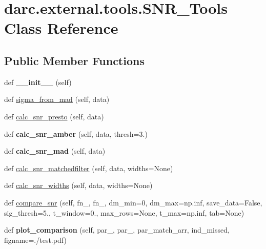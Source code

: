 \hypertarget{classdarc_1_1external_1_1tools_1_1_s_n_r___tools}{}\section{darc.\+external.\+tools.\+S\+N\+R\+\_\+\+Tools Class Reference}
\label{classdarc_1_1external_1_1tools_1_1_s_n_r___tools}
\subsection*{Public Member Functions}
\begin{DoxyCompactItemize}
\item 
\mbox{\label{classdarc_1_1external_1_1tools_1_1_s_n_r___tools_ad70f2490dd7786e16dc51864a407b737}} 
def {\bfseries \+\_\+\+\_\+init\+\_\+\+\_\+} (self)
\item 
def \mbox{\hyperlink{classdarc_1_1external_1_1tools_1_1_s_n_r___tools_a0d702d754a0292c33de8f7ef097a8cff}{sigma\+\_\+from\+\_\+mad}} (self, data)
\item 
def \mbox{\hyperlink{classdarc_1_1external_1_1tools_1_1_s_n_r___tools_a43bc80cfc5246e566f10e35753b34c1e}{calc\+\_\+snr\+\_\+presto}} (self, data)
\item 
\mbox{\label{classdarc_1_1external_1_1tools_1_1_s_n_r___tools_aec625935372545d1a31ff5c4e51b1123}} 
def {\bfseries calc\+\_\+snr\+\_\+amber} (self, data, thresh=3.)
\item 
\mbox{\label{classdarc_1_1external_1_1tools_1_1_s_n_r___tools_a050c6f507006ed54e89fd55a8ada4468}} 
def {\bfseries calc\+\_\+snr\+\_\+mad} (self, data)
\item 
def \mbox{\hyperlink{classdarc_1_1external_1_1tools_1_1_s_n_r___tools_a97eef6fc596dc73dbe0b098aef56be99}{calc\+\_\+snr\+\_\+matchedfilter}} (self, data, widths=None)
\item 
def \mbox{\hyperlink{classdarc_1_1external_1_1tools_1_1_s_n_r___tools_a1bc0ca3b5fbb0f53f6af672622507687}{calc\+\_\+snr\+\_\+widths}} (self, data, widths=None)
\item 
def \mbox{\hyperlink{classdarc_1_1external_1_1tools_1_1_s_n_r___tools_a40765ebd3feabd12ad928534625000f6}{compare\+\_\+snr}} (self, fn\+\_, fn\+\_, dm\+\_\+min=0, dm\+\_\+max=np.\+inf, save\+\_\+data=False, sig\+\_\+thresh=5., t\+\_\+window=0., max\+\_\+rows=None, t\+\_\+max=np.\+inf, tab=None)
\item 
\mbox{\label{classdarc_1_1external_1_1tools_1_1_s_n_r___tools_a201df3687bac2f632ced5de3c588cccb}} 
def {\bfseries plot\+\_\+comparison} (self, par\+\_, par\+\_, par\+\_\+match\+\_\+arr, ind\+\_\+missed, figname=\textquotesingle{}./test.\+pdf\textquotesingle{})
\end{DoxyCompactItemize}
